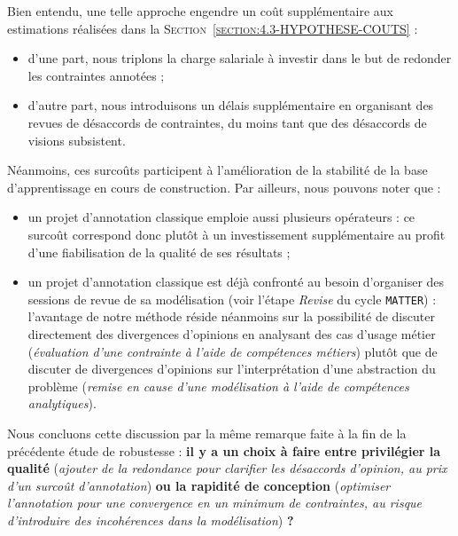 			Bien entendu, une telle approche engendre un coût supplémentaire aux estimations réalisées dans la \textsc{Section~\ref{section:4.3-HYPOTHESE-COUTS}} :
			\begin{itemize}
				\item d'une part, nous triplons la charge salariale à investir dans le but de redonder les contraintes annotées ;
				\item d'autre part, nous introduisons un délais supplémentaire en organisant des revues de désaccords de contraintes, du moins tant que des désaccords de visions subsistent.
			\end{itemize}
			Néanmoins, ces surcoûts participent à l'amélioration de la stabilité de la base d'apprentissage en cours de construction.
			Par ailleurs, nous pouvons noter que :
			\begin{itemize}
				\item un projet d'annotation classique emploie aussi plusieurs opérateurs : ce surcoût correspond donc plutôt à un investissement supplémentaire au profit d'une fiabilisation de la qualité de ses résultats ;
				\item un projet d'annotation classique est déjà confronté au besoin d'organiser des sessions de revue de sa modélisation (voir l'étape \textit{Revise} du cycle \texttt{MATTER}) : l'avantage de notre méthode réside néanmoins sur la possibilité de discuter directement des divergences d'opinions en analysant des cas d'usage métier (\textit{évaluation d'une contrainte à l'aide de compétences métiers}) plutôt que de discuter de divergences d'opinions sur l'interprétation d'une abstraction du problème (\textit{remise en cause d'une modélisation à l'aide de compétences analytiques}).
			\end{itemize}
			
			\begin{leftBarAuthorOpinion}
				Nous concluons cette discussion par la même remarque faite à la fin de la précédente étude de robustesse : \textbf{il y a un choix à faire entre privilégier la qualité} (\textit{ajouter de la redondance pour clarifier les désaccords d'opinion, au prix d'un surcoût d'annotation}) \textbf{ou la rapidité de conception} (\textit{optimiser l'annotation pour une convergence en un minimum de contraintes, au risque d'introduire des incohérences dans la modélisation}) \textbf{?}
			\end{leftBarAuthorOpinion}
		
